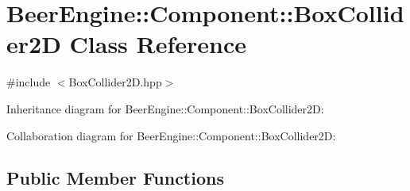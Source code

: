 \hypertarget{class_beer_engine_1_1_component_1_1_box_collider2_d}{}\section{Beer\+Engine\+:\+:Component\+:\+:Box\+Collider2D Class Reference}
\label{class_beer_engine_1_1_component_1_1_box_collider2_d}


{\ttfamily \#include $<$Box\+Collider2\+D.\+hpp$>$}



Inheritance diagram for Beer\+Engine\+:\+:Component\+:\+:Box\+Collider2D\+:


Collaboration diagram for Beer\+Engine\+:\+:Component\+:\+:Box\+Collider2D\+:
\subsection*{Public Member Functions}
